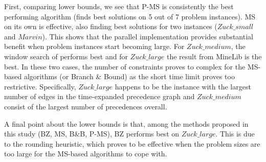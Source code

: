\documentclass[authoryear,11pt,square,number,times,super,comma]{elsarticle}
\begin{document}
First, comparing lower bounds, we see that P-MS is consistently the best performing  algorithm (finds best solutions on 5 out of 7 problem instances). MS on its own is effective, also finding best solutions for two instances ($Zuck\_small$ and $Marvin$). This shows that the parallel implementation provides substantial benefit when problem instances start becoming large. For $Zuck\_medium$, the window search of \citet{Kenny:2017} performs best and for $Zuck\_large$ the result from MineLib is the best. In these two cases, the number of constraints proves to complex for the MS-based algorithms (or Branch \& Bound) as the short time limit proves too restrictive. Specifically, $Zuck\_large$ happens to be the instance with the largest number of edges in the time-expanded precedence graph and $Zuck\_medium$ consist of the largest number of precedences overall. 

A final point about the lower bounds is that, among the methods proposed in this study (BZ, MS, B\&B, P-MS), BZ performs best on $Zuck\_large$. This is due to the rounding heuristic, which proves to be effective when the problem sizes are too large for the  MS-based algorithms to cope with.
\end{document}
